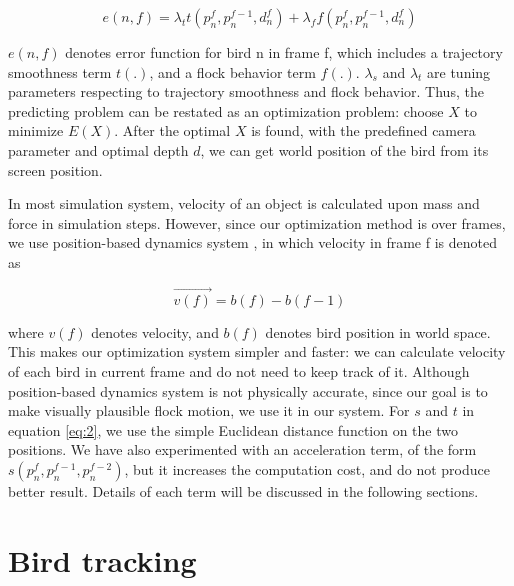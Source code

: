 \begin{equation}\label{eq:2}
 e(n,f) = \lambda_tt(p_n^f, p_n^{f-1},d_n^f) + \lambda_ff(p_n^f, p_n^{f-1},d_n^f)
\end{equation}


$e(n,f)$ denotes error function for bird n in frame f, which includes a trajectory smoothness term $t(.)$, and a flock behavior term $f(.)$. $\lambda_s$ and $\lambda_t$ are tuning parameters respecting to trajectory smoothness and flock behavior. Thus, the predicting problem can be restated as an optimization problem: choose $X$ to minimize $E(X)$. After the optimal $X$ is found, with the predefined camera parameter and optimal depth $d$, we can get world position of the bird from its screen position.


In most simulation system, velocity of an object is calculated upon mass and force in simulation steps. However, since our optimization method is over frames, we use position-based dynamics system \cite{PBD}, in which velocity in frame f is denoted as

\begin{equation}\label{eq:3}
 \vec{v(f)} = b(f)-b(f-1)
\end{equation}

where $v(f)$ denotes velocity, and $b(f)$ denotes bird position in world space. This makes our optimization system simpler and faster: we can calculate velocity of each bird in current frame and do not need to keep track of it. Although position-based dynamics system is not physically accurate, since our goal is to make visually plausible flock motion, we use it in our system.
For $s$ and $t$ in equation \ref{eq:2}, we use the simple Euclidean distance function on the two positions. We have also experimented with an acceleration term, of the form $s(p_n^f, p_n^{f-1}, p_n^{f-2})$, but it increases the computation cost, and do not produce better result. Details of each term will be discussed in the following sections.


\section{Bird tracking}



